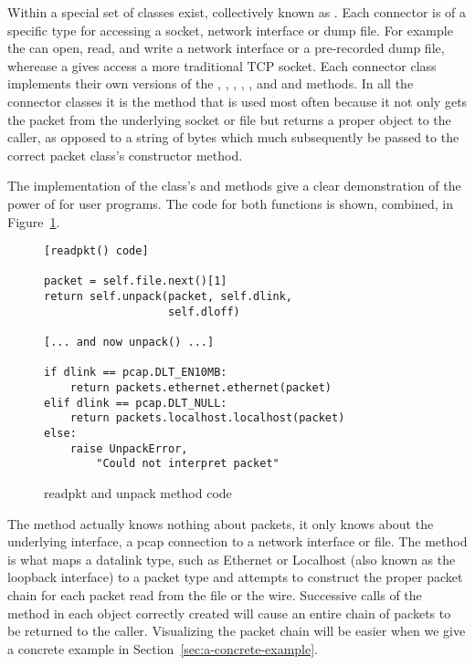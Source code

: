 \documentclass{sig-alternate-10pt}
\begin{document}
Within  a special set of classes exist, collectively
known as .  Each connector is of a specific type for
accessing a socket, network interface or dump file.  For example the
 can open, read, and write a network interface or
a pre-recorded dump file, wherease a  gives access
a more traditional TCP socket.  Each connector class implements their
own versions of the , , ,
, , and  and
 methods.  In all the connector classes it is the
 method that is used most often because it not only
gets the packet from the underlying socket or file but returns a
proper object to the caller, as opposed to a string of bytes which
much subsequently be passed to the correct packet class's constructor
method.

The implementation of the  class's
 and  methods give a clear
demonstration of the power of  for user programs.  The
code for both functions is shown, combined, in
Figure~\ref{fig:readpkt-and-unpack-code}.

\begin{figure}
  \centering
\begin{verbatim}
[readpkt() code]

packet = self.file.next()[1]
return self.unpack(packet, self.dlink, 
                   self.dloff)

[... and now unpack() ...]

if dlink == pcap.DLT_EN10MB:
    return packets.ethernet.ethernet(packet)
elif dlink == pcap.DLT_NULL:
    return packets.localhost.localhost(packet)
else:
    raise UnpackError, 
        "Could not interpret packet"
\end{verbatim}
  \caption{readpkt and unpack method code}
  \label{fig:readpkt-and-unpack-code}
\end{figure}

The  method actually knows nothing about packets, it
only knows about the underlying interface, a pcap connection to a
network interface or file.  The  method is what maps a
datalink type, such as Ethernet or Localhost (also known as the
loopback interface) to a packet type and attempts to construct the
proper packet chain for each packet read from the file or the wire.
Successive calls of the  method in each object correctly
created will cause an entire chain of packets to be returned to the
caller.  Visualizing the packet chain will be easier when we give a
concrete example in Section~\ref{sec:a-concrete-example}.
\end{document}
